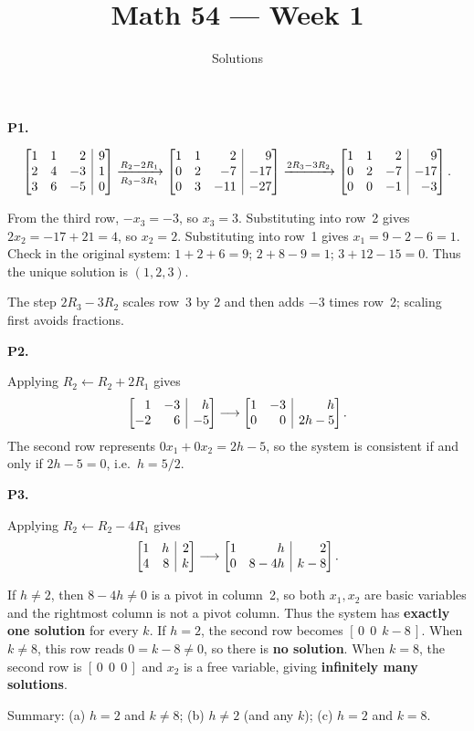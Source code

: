 \documentclass[10pt]{scrartcl}
\title{Math 54 --- Week 1}
\subtitle{Solutions}
\author{}\date{}\ihead{}
\makeatletter
\newcommand{\aug}[2]{\left[\begin{array}{@{}#1@{}}#2\end{array}\right]}
\makeatother
\begin{document}
\maketitle

\begin{prob}\textbf{P1.}\par{}
\[
  \aug{rrr|r}{1&1&2&9\\2&4&-3&1\\3&6&-5&0}
  \xrightarrow[R_3-3R_1]{R_2-2R_1}\aug{rrr|r}{1&1&2&9\\0&2&-7&-17\\0&3&-11&-27}
  \xrightarrow{2R_3-3R_2}\aug{rrr|r}{1&1&2&9\\0&2&-7&-17\\0&0&-1&-3}.
\]
\begin{steps}
  \ii From the third row, $-x_3=-3$, so $x_3=3$. Substituting into row~2 gives $2x_2=-17+21=4$, so $x_2=2$. Substituting into row~1 gives $x_1=9-2-6=1$.
  \ii Check in the original system: $1+2+6=9$; $2+8-9=1$; $3+12-15=0$. Thus the unique solution is $(1,2,3)$.
\end{steps}
The step $2R_3-3R_2$ scales row~3 by $2$ and then adds $-3$ times row~2; scaling first avoids fractions.
\end{prob}

\begin{prob}\textbf{P2.}\par{}
Applying $R_2\leftarrow R_2+2R_1$ gives
\[
  \aug{rr|r}{1&-3&h\\-2&6&-5}\longrightarrow\aug{rr|r}{1&-3&h\\0&0&2h-5}.
\]
The second row represents $0x_1+0x_2=2h-5$, so the system is consistent if and only if $2h-5=0$, i.e.\ $h=5/2$.
\end{prob}

\begin{prob}\textbf{P3.}\par{}
Applying $R_2\leftarrow R_2-4R_1$ gives
\[
  \aug{rr|r}{1&h&2\\4&8&k}\longrightarrow\aug{rr|r}{1&h&2\\0&8-4h&k-8}.
\]
\begin{steps}
  \ii If $h\ne2$, then $8-4h\ne0$ is a pivot in column~2, so both $x_1,x_2$ are basic variables and the rightmost column is not a pivot column. Thus the system has \textbf{exactly one solution} for every $k$.
  \ii If $h=2$, the second row becomes $[\,0\ \ 0\ \ k-8\,]$. When $k\ne8$, this row reads $0=k-8\ne0$, so there is \textbf{no solution}. When $k=8$, the second row is $[\,0\ \ 0\ \ 0\,]$ and $x_2$ is a free variable, giving \textbf{infinitely many solutions}.
\end{steps}
Summary: (a) $h=2$ and $k\ne8$; (b) $h\ne2$ (and any $k$); (c) $h=2$ and $k=8$.
\end{prob}
\end{document}

